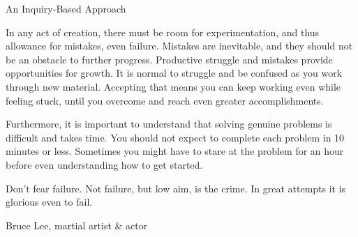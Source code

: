 \begin{section}{An Inquiry-Based Approach}

In any act of creation, there must be room for experimentation, and thus allowance for mistakes, even failure. Mistakes are inevitable, and they should not be an obstacle to further progress. Productive struggle and mistakes provide opportunities for growth.  It is normal to struggle and be confused as you work through new material. Accepting that means you can keep working even while feeling stuck, until you overcome and reach even greater accomplishments.


Furthermore, it is important to understand that solving genuine problems is difficult and takes time.  You should not expect to complete each problem in 10 minutes or less.  Sometimes you might have to stare at the problem for an hour before even understanding how to get started.


\epigraph{Don't fear failure.  Not failure, but low aim, is the crime. In great attempts it is glorious even to fail.}{Bruce Lee, martial artist \& actor}

\end{section}

